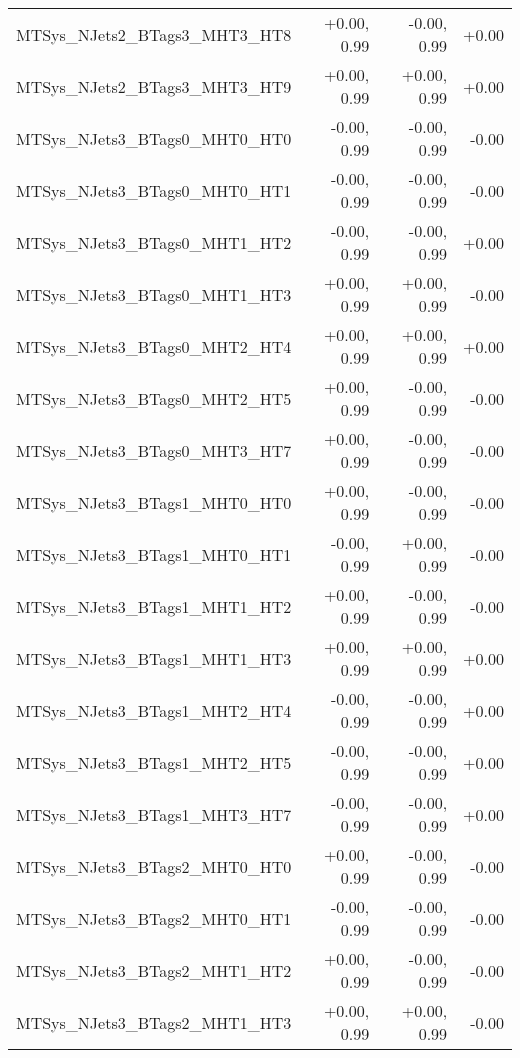 \begin{tabular}{|l|r|r|r|}
MTSys\_NJets2\_BTags3\_MHT3\_HT8         &      +0.00, 0.99 &     -0.00, 0.99 &  +0.00 \\
MTSys\_NJets2\_BTags3\_MHT3\_HT9         &      +0.00, 0.99 &     +0.00, 0.99 &  +0.00 \\
MTSys\_NJets3\_BTags0\_MHT0\_HT0         &      -0.00, 0.99 &     -0.00, 0.99 &  -0.00 \\
MTSys\_NJets3\_BTags0\_MHT0\_HT1         &      -0.00, 0.99 &     -0.00, 0.99 &  -0.00 \\
MTSys\_NJets3\_BTags0\_MHT1\_HT2         &      -0.00, 0.99 &     -0.00, 0.99 &  +0.00 \\
MTSys\_NJets3\_BTags0\_MHT1\_HT3         &      +0.00, 0.99 &     +0.00, 0.99 &  -0.00 \\
MTSys\_NJets3\_BTags0\_MHT2\_HT4         &      +0.00, 0.99 &     +0.00, 0.99 &  +0.00 \\
MTSys\_NJets3\_BTags0\_MHT2\_HT5         &      +0.00, 0.99 &     -0.00, 0.99 &  -0.00 \\
MTSys\_NJets3\_BTags0\_MHT3\_HT7         &      +0.00, 0.99 &     -0.00, 0.99 &  -0.00 \\
MTSys\_NJets3\_BTags1\_MHT0\_HT0         &      +0.00, 0.99 &     -0.00, 0.99 &  -0.00 \\
MTSys\_NJets3\_BTags1\_MHT0\_HT1         &      -0.00, 0.99 &     +0.00, 0.99 &  -0.00 \\
MTSys\_NJets3\_BTags1\_MHT1\_HT2         &      +0.00, 0.99 &     -0.00, 0.99 &  -0.00 \\
MTSys\_NJets3\_BTags1\_MHT1\_HT3         &      +0.00, 0.99 &     +0.00, 0.99 &  +0.00 \\
MTSys\_NJets3\_BTags1\_MHT2\_HT4         &      -0.00, 0.99 &     -0.00, 0.99 &  +0.00 \\
MTSys\_NJets3\_BTags1\_MHT2\_HT5         &      -0.00, 0.99 &     -0.00, 0.99 &  +0.00 \\
MTSys\_NJets3\_BTags1\_MHT3\_HT7         &      -0.00, 0.99 &     -0.00, 0.99 &  +0.00 \\
MTSys\_NJets3\_BTags2\_MHT0\_HT0         &      +0.00, 0.99 &     -0.00, 0.99 &  -0.00 \\
MTSys\_NJets3\_BTags2\_MHT0\_HT1         &      -0.00, 0.99 &     -0.00, 0.99 &  -0.00 \\
MTSys\_NJets3\_BTags2\_MHT1\_HT2         &      +0.00, 0.99 &     -0.00, 0.99 &  -0.00 \\
MTSys\_NJets3\_BTags2\_MHT1\_HT3         &      +0.00, 0.99 &     +0.00, 0.99 &  -0.00 \\

\end{tabular}
